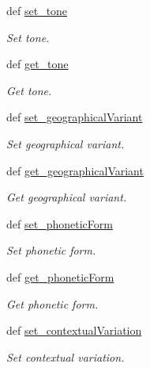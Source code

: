 \begin{DoxyCompactItemize}
def \hyperlink{classlmf_1_1src_1_1core_1_1form__representation_1_1_form_representation_abec34e3beb923b2f0026bb1a4dfd4603}{set\+\_\+tone}
\begin{DoxyCompactList}\small\item\em Set tone. \end{DoxyCompactList}\item 
def \hyperlink{classlmf_1_1src_1_1core_1_1form__representation_1_1_form_representation_a58c2fa474ace9d9f98fe09f62fc1e1cc}{get\+\_\+tone}
\begin{DoxyCompactList}\small\item\em Get tone. \end{DoxyCompactList}\item 
def \hyperlink{classlmf_1_1src_1_1core_1_1form__representation_1_1_form_representation_a6ea94ec5271f4d004a97090a1dfca797}{set\+\_\+geographical\+Variant}
\begin{DoxyCompactList}\small\item\em Set geographical variant. \end{DoxyCompactList}\item 
def \hyperlink{classlmf_1_1src_1_1core_1_1form__representation_1_1_form_representation_a7856919f832d77bac3c4183fa63193b0}{get\+\_\+geographical\+Variant}
\begin{DoxyCompactList}\small\item\em Get geographical variant. \end{DoxyCompactList}\item 
def \hyperlink{classlmf_1_1src_1_1core_1_1form__representation_1_1_form_representation_a26df452a549ce25256429b0820b42cd5}{set\+\_\+phonetic\+Form}
\begin{DoxyCompactList}\small\item\em Set phonetic form. \end{DoxyCompactList}\item 
def \hyperlink{classlmf_1_1src_1_1core_1_1form__representation_1_1_form_representation_afd063ac9cf7a1c412010c2885be8b451}{get\+\_\+phonetic\+Form}
\begin{DoxyCompactList}\small\item\em Get phonetic form. \end{DoxyCompactList}\item 
def \hyperlink{classlmf_1_1src_1_1core_1_1form__representation_1_1_form_representation_a4cd93976760ea4d01d9c448eaf051395}{set\+\_\+contextual\+Variation}
\begin{DoxyCompactList}\small\item\em Set contextual variation. \end{DoxyCompactList}\item 

\end{DoxyCompactItemize}
